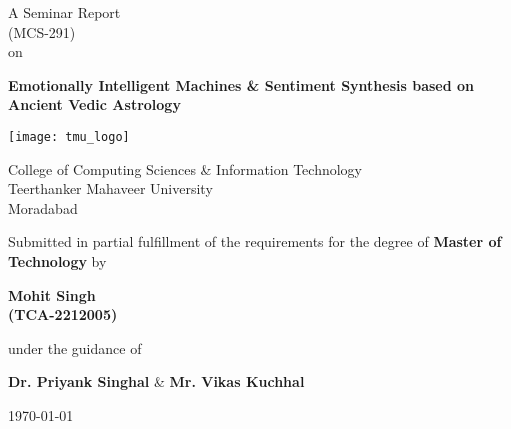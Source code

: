 \begin{titlepage}	
	\centering
	
	\LARGE A Seminar Report\\(MCS-291)\\on
	\vspace{1\baselineskip}
	
	\textbf{Emotionally Intelligent Machines \& Sentiment Synthesis based on Ancient Vedic Astrology}
	\vspace{1\baselineskip}
	
	\texttt{[image: tmu\_logo]}
	
	College of Computing Sciences \& Information Technology\\Teerthanker Mahaveer University\\Moradabad
	\vspace{1\baselineskip}
	
	Submitted in partial fulfillment of	the requirements for the degree of \textbf{Master of Technology} by
	\vspace{1\baselineskip}
	
	\textbf{Mohit Singh\\(TCA-2212005)}
	\vspace{1\baselineskip}
	
	under the guidance of
	
	\textbf{Dr. Priyank Singhal} \& \textbf{Mr. Vikas Kuchhal}
	\vspace{1\baselineskip}
	
	{\Large \today}
\end{titlepage}
\clearpage